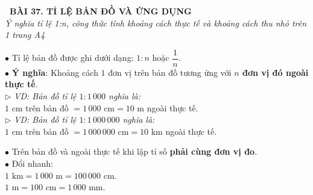 \documentclass[14pt,a4paper,oneside]{extbook}
\begin{document}
\noindent
\begin{tcolorbox}[
  enhanced,
  colback=teal!8!white,
  colframe=teal!80!black,
  arc=3mm,
  boxrule=1.1pt,
  width=\linewidth,
  halign=center,
  top=2.2mm, bottom=2.2mm,
  left=3mm, right=3mm,
  drop fuzzy shadow
]
  {\large\bfseries\color{teal!95!black}\faBookmark\ BÀI 37. TỈ LỆ BẢN ĐỒ VÀ ỨNG DỤNG}\\[2pt]
  {\scriptsize\color{black!75}\itshape Ý nghĩa tỉ lệ 1:n, công thức tính khoảng cách thực tế và khoảng cách thu nhỏ trên 1 trang A4}
\end{tcolorbox}

\vspace{3.2mm}
\noindent
\begin{minipage}[t]{0.56\textwidth}
  \begin{tcolorbox}[
    enhanced,
    title={\footnotesize\bfseries\color{white}\faMapO\ 1. Khái niệm Tỉ lệ bản đồ},
    colback=blue!2!white,
    colframe=blue!75!black,
    arc=2.5mm, boxrule=0.8pt, top=1.8mm, bottom=1.8mm, left=2.2mm, right=2.2mm
  ]
    \footnotesize
    $\bullet$ Tỉ lệ bản đồ được ghi dưới dạng: \textbf{$1 : n$} hoặc $\dfrac{1}{n}$.\\
    $\bullet$ \textbf{Ý nghĩa}: Khoảng cách $1$ đơn vị trên bản đồ tương ứng với \textbf{$n$ đơn vị đó ngoài thực tế}.\\
    $\triangleright$ \textit{VD: Bản đồ tỉ lệ $1 : 1\,000$ nghĩa là:}\\
    \quad $1\text{ cm}$ trên bản đồ $= 1\,000\text{ cm} = 10\text{ m}$ ngoài thực tế.\\
    $\triangleright$ \textit{VD: Bản đồ tỉ lệ $1 : 1\,000\,000$ nghĩa là:}\\
    \quad $1\text{ cm}$ trên bản đồ $= 1\,000\,000\text{ cm} = 10\text{ km}$ ngoài thực tế.
  \end{tcolorbox}
\end{minipage}%
\hfill
\begin{minipage}[t]{0.42\textwidth}
  \begin{tcolorbox}[
    enhanced,
    title={\footnotesize\bfseries\color{white}\faSearch\ 2. Nguyên tắc đồng vị đo},
    colback=teal!2!white,
    colframe=teal!75!black,
    arc=2.5mm, boxrule=0.8pt, top=1.8mm, bottom=1.8mm, left=2mm, right=2mm
  ]
    \footnotesize
    $\bullet$ Trên bản đồ và ngoài thực tế khi lập tỉ số \textbf{phải cùng đơn vị đo}.\\
    $\bullet$ Đổi nhanh:\\
    $1\text{ km} = 1\,000\text{ m} = 100\,000\text{ cm}$.\\
    $1\text{ m} = 100\text{ cm} = 1\,000\text{ mm}$.
  \end{tcolorbox}
\end{minipage}
\end{document}
